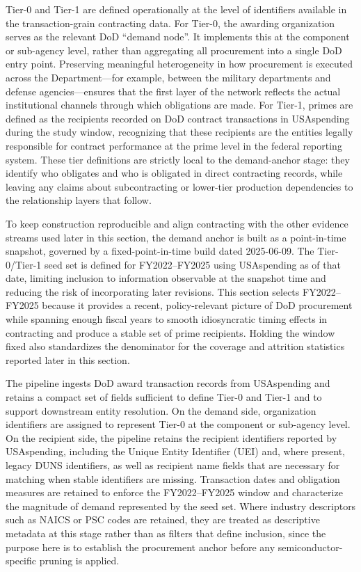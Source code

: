 Tier-0 and Tier-1 are defined operationally at the level of identifiers available in the transaction-grain contracting data. For Tier-0, the awarding organization serves as the relevant DoD ``demand node''. It implements this at the component or sub-agency level, rather than aggregating all procurement into a single DoD entry point. Preserving meaningful heterogeneity in how procurement is executed across the Department---for example, between the military departments and defense agencies---ensures that the first layer of the network reflects the actual institutional channels through which obligations are made. For Tier-1, primes are defined as the recipients recorded on DoD contract transactions in USAspending during the study window, recognizing that these recipients are the entities legally responsible for contract performance at the prime level in the federal reporting system. These tier definitions are strictly local to the demand-anchor stage: they identify who obligates and who is obligated in direct contracting records, while leaving any claims about subcontracting or lower-tier production dependencies to the relationship layers that follow.

To keep construction reproducible and align contracting with the other evidence streams used later in this section, the demand anchor is built as a point-in-time snapshot, governed by a fixed-point-in-time build dated 2025-06-09. The Tier-0/Tier-1 seed set is defined for FY2022--FY2025 using USAspending as of that date, limiting inclusion to information observable at the snapshot time and reducing the risk of incorporating later revisions. This section selects FY2022--FY2025 because it provides a recent, policy-relevant picture of DoD procurement while spanning enough fiscal years to smooth idiosyncratic timing effects in contracting and produce a stable set of prime recipients. Holding the window fixed also standardizes the denominator for the coverage and attrition statistics reported later in this section.

The pipeline ingests DoD award transaction records from USAspending and retains a compact set of fields sufficient to define Tier-0 and Tier-1 and to support downstream entity resolution. On the demand side, organization identifiers are assigned to represent Tier-0 at the component or sub-agency level. On the recipient side, the pipeline retains the recipient identifiers reported by USAspending, including the Unique Entity Identifier (UEI) and, where present, legacy DUNS identifiers, as well as recipient name fields that are necessary for matching when stable identifiers are missing. Transaction dates and obligation measures are retained to enforce the FY2022--FY2025 window and characterize the magnitude of demand represented by the seed set. Where industry descriptors such as NAICS or PSC codes are retained, they are treated as descriptive metadata at this stage rather than as filters that define inclusion, since the purpose here is to establish the procurement anchor before any semiconductor-specific pruning is applied.

